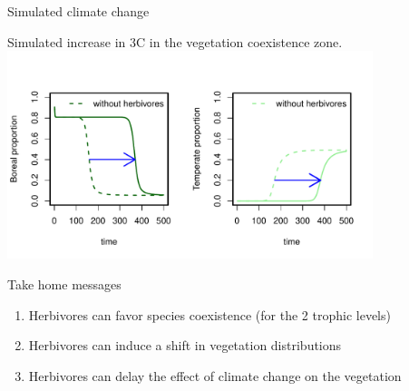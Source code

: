 \documentclass[10pt,aspectratio=149]{beamer}
\begin{document}
\begin{frame}{Simulated climate change}

Simulated increase in 3\degre C in the vegetation coexistence zone.
\centering
\includegraphics[width=0.8\textwidth]{../graphs/climate_change.pdf}\\


\end{frame}




\begin{frame}{Take home messages}

\begin{enumerate}

\item Herbivores can \alert{favor species coexistence} (for the 2 trophic levels)

\item Herbivores can induce a \alert{shift} in vegetation distributions 

\item Herbivores can \alert{delay} the effect of climate change on the vegetation

\end{enumerate}

\end{frame}


\end{document}
